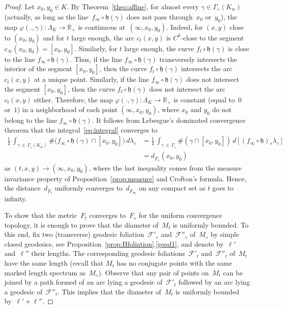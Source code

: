 \documentclass[AHL,Unicode,longabstracts,published]{cedram}
\newcommand{\FF}{\mathcal{F}}
\newcommand{\R}{\mathbb{R}}
\newcommand{\bh}{\mathfrak{h}}
\begin{document}
\begin{proof}
Let $x_0,y_0 \in K$. By Theorem~\ref{theo:affine}, for almost every $\gamma \in \Gamma_\diamond(K_w)$ (actually, as long as the line~$f_\infty \circ \bh(\gamma)$ does not pass through~$x_0$ or~$y_0$), the map $\varphi(.,\gamma): \Lambda_K \to \R_+$ is continuous at~$(\infty,x_0,y_0)$. Indeed, for $(x,y)$ close to $(x_{0},y_{0})$ and for $t$ large enough, the arc $c_{t}(x,y)$ is $C^{k}$-close to the segment $c_{\infty}(x_{0},y_{0})=[x_{0},y_{0}]$. Similarly, for $t$ large enough, the curve $f_{t}\circ\bh(\gamma)$ is close to the line $f_{\infty}\circ\bh(\gamma)$. Thus, if the line $f_{\infty}\circ\bh(\gamma)$ transversely intersects the interior of the segment $[x_{0},y_{0}]$, then the curve $f_{t}\circ\bh(\gamma)$ intersects the arc $c_{t}(x,y)$ at a unique point. Similarly, if the line $f_{\infty}\circ\bh(\gamma)$ does not intersect the segment $[x_{0},y_{0}]$, then the curve $f_{t}\circ\bh(\gamma)$ does not intersect the arc $c_{t}(x,y)$ either. Therefore, the map $\varphi(\cdot,\gamma):\Lambda_{K}\to\R_{+}$ is constant (equal to~$0$ or~$1$) in a neighborhood of each point $(\infty,x_{0},y_{0})$, where $x_{0}$ and $y_{0}$ do not belong to the line $f_{\infty}\circ\bh(\gamma)$. It follows from Lebesgue's dominated convergence theorem that the integral~\eqref{eq:integral} converges to
\begin{align*}
\frac{1}{4} \, \int_{\gamma\,\in\,\Gamma_\diamond(K_w)} \#\big(f_\infty \circ \bh(\gamma) \cap [x_0,y_0]\big) \, d\lambda_\diamond & = \frac{1}{4} \, \int_{\gamma\,\in\,\Gamma_\diamond} \#(\gamma \cap [x_0,y_0]) \, d[(f_\infty \circ \bh)_* \lambda_\diamond] \\
& = d_{\bar{F}_\diamond}(x_0,y_0)
\end{align*}
as $(t,x,y) \to (\infty,x_0,y_0)$, where the last inequality comes from the measure invariance property of Proposition~\ref{prop:measure} and Crofton's formula. Hence, the distance~$d_{\bar{F}_t}$ uniformly converges to~$d_{\bar{F}_\infty}$ on any compact set as $t$ goes to infinity.

To show that the metric~$F_t$ converges to~$F_\diamond$ for the uniform convergence topology, it is enough to prove that the diameter of~$M_t$ is uniformly bounded. To this end, fix two (transverse) geodesic foliation~$\FF'_\diamond$ and~$\FF''_\diamond$ of~$M_\diamond$ by simple closed geodesics, see Proposition~\ref{prop:Hfoliation}.\eqref{geod1}, and denote by~$\ell'$ and~$\ell''$ their lengths. The corresponding geodesic foliations~$\FF'_t$ and~$\FF''_t$ of~$M_t$ have the same length (recall that $M_t$ has no conjugate points with the same marked length spectrum as~$M_\diamond$). Observe that any pair of points on~$M_t$ can be joined by a path formed of an arc lying a geodesic of~$\FF'_t$ followed by an arc lying a geodesic of~$\FF''_t$. This implies that the diameter of~$M_t$ is uniformly bounded by~$\ell'+\ell''$.
\end{proof}
\end{document}
